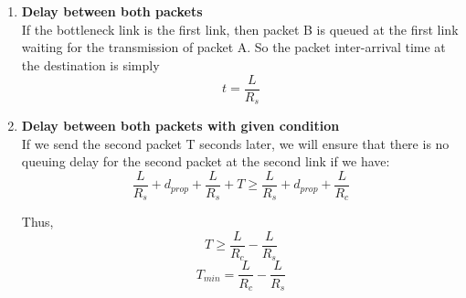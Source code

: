 \documentclass[12pt]{article}
\begin{document}
    \section{}
    \begin{enumerate}[label=(\alph*)]

    \item \textbf{Delay between both packets} \\
    If the bottleneck link is the first link, then packet B is queued at the first link waiting for the transmission of packet A. So the packet inter-arrival time at the destination is simply \begin{equation*}
        t = \frac{L}{R_{s}}
    \end{equation*}
    
    \item \textbf{Delay between both packets with given condition}\\
        If we send the second packet T seconds later, we will ensure that there is no queuing delay for the second packet at the second link if we have:
        \begin{equation*}
            \frac{L}{R_{s}} + d_{prop} + \frac{L}{R_{s}} + T \geqslant \frac{L}{R_{s}} + d_{prop} + \frac{L}{R_{c}}
    \end{equation*}
    
    Thus,
    \begin{equation*}
        T \geqslant \frac{L}{R_{c}} - \frac{L}{R_{s}}
    \end{equation*}
    \begin{equation*}
        T_{min} = \frac{L}{R_{c}} - \frac{L}{R_{s}}
    \end{equation*}
    \end{enumerate}
\end{document}
